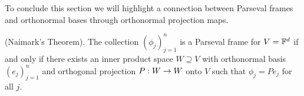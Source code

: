 To conclude this section we will highlight a connection between Parseval frames and orthonormal bases through orthonormal projection maps.
\iftoggle{full}{
\begin{Definition}
\label{def:ortho_proj}
    A linear operator $P: V \ra V$ is called a \textit{projection} if $P^2=P$. Furthermore, a projection $P$ is called an \textit{orthogonal projection} if $P$ is Hermitian, that is $P=P^*$.
\end{Definition}
}{}
\begin{thm}(Naimark's Theorem).
\label{thm:naimark}
The collection $(\phi_j)_{j=1}^n$ is a Parseval frame for $V=\mathbb{F}^d$ if and only if there exists an inner product space $W\supseteq V$ with orthonormal basis $(e_j)_{j=1}^n$ and orthogonal projection $P:W\rightarrow W$ onto $V$ such that $\phi_j=Pe_j$ for all $j$.
\end{thm}
